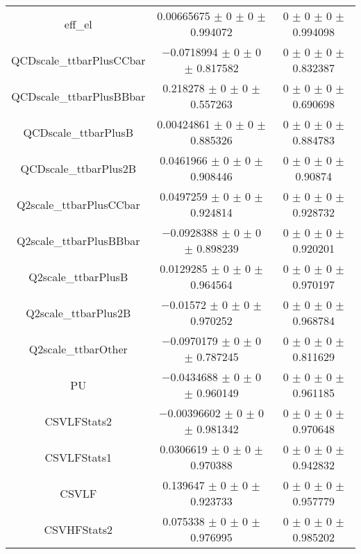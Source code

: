 \begin{table}
\begin{tabular}{ccc}
eff\_el & \num{0.00665675} $\pm$ \num{0} $\pm$ \num{0} $\pm$ \num{0.994072} & \num{0} $\pm$ \num{0} $\pm$ \num{0} $\pm$ \num{0.994098}\\
QCDscale\_ttbarPlusCCbar & \num{-0.0718994} $\pm$ \num{0} $\pm$ \num{0} $\pm$ \num{0.817582} & \num{0} $\pm$ \num{0} $\pm$ \num{0} $\pm$ \num{0.832387}\\
QCDscale\_ttbarPlusBBbar & \num{0.218278} $\pm$ \num{0} $\pm$ \num{0} $\pm$ \num{0.557263} & \num{0} $\pm$ \num{0} $\pm$ \num{0} $\pm$ \num{0.690698}\\
QCDscale\_ttbarPlusB & \num{0.00424861} $\pm$ \num{0} $\pm$ \num{0} $\pm$ \num{0.885326} & \num{0} $\pm$ \num{0} $\pm$ \num{0} $\pm$ \num{0.884783}\\
QCDscale\_ttbarPlus2B & \num{0.0461966} $\pm$ \num{0} $\pm$ \num{0} $\pm$ \num{0.908446} & \num{0} $\pm$ \num{0} $\pm$ \num{0} $\pm$ \num{0.90874}\\
Q2scale\_ttbarPlusCCbar & \num{0.0497259} $\pm$ \num{0} $\pm$ \num{0} $\pm$ \num{0.924814} & \num{0} $\pm$ \num{0} $\pm$ \num{0} $\pm$ \num{0.928732}\\
Q2scale\_ttbarPlusBBbar & \num{-0.0928388} $\pm$ \num{0} $\pm$ \num{0} $\pm$ \num{0.898239} & \num{0} $\pm$ \num{0} $\pm$ \num{0} $\pm$ \num{0.920201}\\
Q2scale\_ttbarPlusB & \num{0.0129285} $\pm$ \num{0} $\pm$ \num{0} $\pm$ \num{0.964564} & \num{0} $\pm$ \num{0} $\pm$ \num{0} $\pm$ \num{0.970197}\\
Q2scale\_ttbarPlus2B & \num{-0.01572} $\pm$ \num{0} $\pm$ \num{0} $\pm$ \num{0.970252} & \num{0} $\pm$ \num{0} $\pm$ \num{0} $\pm$ \num{0.968784}\\
Q2scale\_ttbarOther & \num{-0.0970179} $\pm$ \num{0} $\pm$ \num{0} $\pm$ \num{0.787245} & \num{0} $\pm$ \num{0} $\pm$ \num{0} $\pm$ \num{0.811629}\\
PU & \num{-0.0434688} $\pm$ \num{0} $\pm$ \num{0} $\pm$ \num{0.960149} & \num{0} $\pm$ \num{0} $\pm$ \num{0} $\pm$ \num{0.961185}\\
CSVLFStats2 & \num{-0.00396602} $\pm$ \num{0} $\pm$ \num{0} $\pm$ \num{0.981342} & \num{0} $\pm$ \num{0} $\pm$ \num{0} $\pm$ \num{0.970648}\\
CSVLFStats1 & \num{0.0306619} $\pm$ \num{0} $\pm$ \num{0} $\pm$ \num{0.970388} & \num{0} $\pm$ \num{0} $\pm$ \num{0} $\pm$ \num{0.942832}\\
CSVLF & \num{0.139647} $\pm$ \num{0} $\pm$ \num{0} $\pm$ \num{0.923733} & \num{0} $\pm$ \num{0} $\pm$ \num{0} $\pm$ \num{0.957779}\\
CSVHFStats2 & \num{0.075338} $\pm$ \num{0} $\pm$ \num{0} $\pm$ \num{0.976995} & \num{0} $\pm$ \num{0} $\pm$ \num{0} $\pm$ \num{0.985202}\\

\end{tabular}
\end{table}
